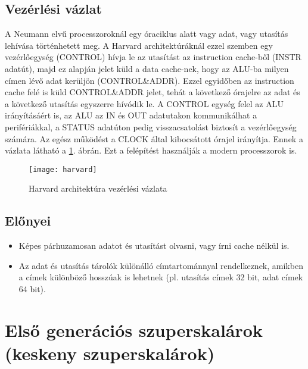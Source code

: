 \subsection{Vezérlési vázlat}
A Neumann elvű processzoroknál egy óraciklus alatt vagy adat, vagy utasítás lehívása történhetett meg.
A Harvard architektúráknál ezzel szemben egy vezérlőegység (CONTROL) hívja le az utasítást az instruction cache-ből (INSTR adatút), majd ez alapján jelet küld a data cache-nek, hogy az ALU-ba milyen címen lévő adat kerüljön (CONTROL\&ADDR).
Ezzel egyidőben az instruction cache felé is küld CONTROL\&ADDR jelet, tehát a következő órajelre az adat és a következő utasítás egyszerre hívódik le.
A CONTROL egység felel az ALU irányításáért is, az ALU az IN és OUT adatutakon kommunikálhat a perifériákkal, a STATUS adatúton pedig visszacsatolást biztosít a vezérlőegység számára.
Az egész működést a CLOCK által kibocsátott órajel irányítja.
Ennek a vázlata látható a \ref{fig:harvard}. ábrán.
Ezt a felépítést használják a modern processzorok is.
\begin{figure}[h]
    \texttt{[image: harvard]}
    \centering
    \caption{Harvard architektúra vezérlési vázlata}
    \label{fig:harvard}
\end{figure}

\subsection{Előnyei}
\begin{itemize}
    \item Képes párhuzamosan adatot és utasítást olvasni, vagy írni cache nélkül is.
    \item Az adat és utasítás tárolók különálló címtartománnyal rendelkeznek, amikben a címek különböző hosszúak is lehetnek (pl. utasítás címek 32 bit, adat címek 64 bit).
\end{itemize}

\section{Első generációs szuperskalárok (keskeny szuperskalárok)}

